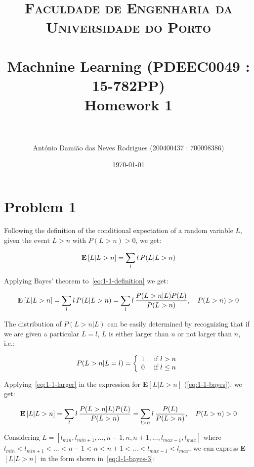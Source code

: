 \documentclass[paper=a4, fontsize=11pt]{scrartcl} %
\title{	
\normalfont \normalsize 
\textsc{Faculdade de Engenharia da Universidade do Porto} \\ [25pt] %
\horrule{0.5pt} \\[0.4cm] %
\LARGE Machnine Learning (PDEEC0049 : 15-782PP)\\ \Large Homework 1 \\ %
\horrule{2pt} \\[0.5cm] %
}
\author{António Damião das Neves Rodrigues (200400437 : 700098386)} %
\date{\normalsize\today} %
\numberwithin{equation}{section} %
\numberwithin{figure}{section} %
\numberwithin{table}{section} %
\begin{document}
\maketitle %

\section{Problem 1}

Following the definition of the conditional expectation of a random variable $L$,
given the event $L > n$ with $P(L > n) > 0$, we get:

\begin{equation}
    \textbf{E}\left[L|L > n\right] = \sum\limits_{l} l \thinspace P(L|L > n)
    \label{eq:1-1-definition}
\end{equation}

Applying Bayes' theorem to~\ref{eq:1-1-definition} we get:

\begin{equation}
    \textbf{E}\left[L|L > n\right] = \sum\limits_{l} l \thinspace P(L|L > n) = \sum\limits_{l} l \thinspace \frac{P(L > n|L)P(L)}{P(L > n)}, \quad P(L > n) > 0
    \label{eq:1-1-bayes}
\end{equation}

The distribution of $P(L > n|L)$ can be easily determined by recognizing that if 
we are given a particular $L=l$, $L$ is either larger than $n$ 
or not larger than $n$, i.e.:

\begin{equation}
    P(L > n|L = l) = \left\{ 
        \begin{array}{rl}
            1 &\mbox{ \text{if $l > n$}} \\
            0 &\mbox{ \text{if $l \le n$}}
        \end{array} \right.
    \label{eq:1-1-larger}
\end{equation}

Applying~\ref{eq:1-1-larger} in the expression for 
\textbf{E}$\left[L|L > n\right]$ (\ref{eq:1-1-bayes}), we get:

\begin{equation}
    \textbf{E}\left[L|L > n\right] = \sum\limits_{l} l \thinspace \frac{P(L > n|L)P(L)}{P(L > n)} = \sum\limits_{l > n} l \thinspace \frac{P(L)}{P(L > n)}, \quad P(L > n) > 0
    \label{eq:1-1-bayes-2}
\end{equation}

Considering $L = [l_{min}, l_{min + 1}, ... , n - 1, n, n + 1, ... , l_{max - 1}, 
l_{max}]$ where $l_{min} < l_{min + 1} < ... < n - 1 < n < n + 1 < ... < 
l_{max - 1} < l_{max}$, we can express \textbf{E}$\left[L|L > n\right]$ in 
the form shown in~\ref{eq:1-1-bayes-3}:
\end{document}
